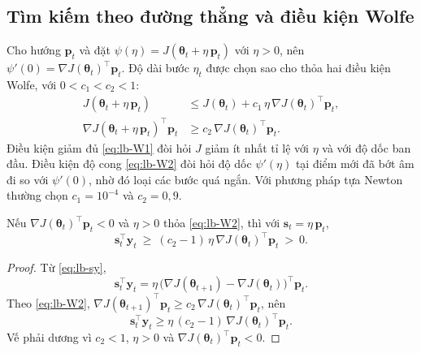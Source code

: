 \subsection{Tìm kiếm theo đường thẳng và điều kiện Wolfe}

Cho hướng $\mathbf{p}_t$ và đặt $\psi(\eta)=J(\boldsymbol{\theta}_t+\eta\,\mathbf{p}_t)$ với $\eta>0$, nên $\psi'(0)=\nabla J(\boldsymbol{\theta}_t)^{\top}\mathbf{p}_t$. Độ dài bước $\eta_t$ được chọn sao cho thỏa hai điều kiện Wolfe, với $0<c_1<c_2<1$:
\begin{align}
  J(\boldsymbol{\theta}_t+\eta\,\mathbf{p}_t)&\le J(\boldsymbol{\theta}_t)+c_1\,\eta\,\nabla J(\boldsymbol{\theta}_t)^{\top}\mathbf{p}_t, \tag{W1}\label{eq:lb-W1}\\
  \nabla J(\boldsymbol{\theta}_t+\eta\,\mathbf{p}_t)^{\top}\mathbf{p}_t&\ge c_2\,\nabla J(\boldsymbol{\theta}_t)^{\top}\mathbf{p}_t. \tag{W2}\label{eq:lb-W2}
\end{align}
Điều kiện giảm đủ \eqref{eq:lb-W1} đòi hỏi $J$ giảm ít nhất tỉ lệ với $\eta$ và với độ dốc ban đầu. Điều kiện độ cong \eqref{eq:lb-W2} đòi hỏi độ dốc $\psi'(\eta)$ tại điểm mới đã bớt âm đi so với $\psi'(0)$, nhờ đó loại các bước quá ngắn. Với phương pháp tựa Newton thường chọn $c_1=10^{-4}$ và $c_2=0{,}9$.

\begin{proposition}\label{prop:lb-wolfe-curv}
Nếu $\nabla J(\boldsymbol{\theta}_t)^{\top}\mathbf{p}_t<0$ và $\eta>0$ thỏa \eqref{eq:lb-W2}, thì với $\mathbf{s}_t=\eta\,\mathbf{p}_t$,
\begin{equation*}
  \mathbf{s}_t^{\top}\mathbf{y}_t\ \ge\ (c_2-1)\,\eta\,\nabla J(\boldsymbol{\theta}_t)^{\top}\mathbf{p}_t\ >\ 0 .
\end{equation*}
\end{proposition}

\begin{proof}
Từ \eqref{eq:lb-sy},
\begin{equation*}
  \mathbf{s}_t^{\top}\mathbf{y}_t=\eta\,\big(\nabla J(\boldsymbol{\theta}_{t+1})-\nabla J(\boldsymbol{\theta}_t)\big)^{\top}\mathbf{p}_t .
\end{equation*}
Theo \eqref{eq:lb-W2}, $\nabla J(\boldsymbol{\theta}_{t+1})^{\top}\mathbf{p}_t\ge c_2\,\nabla J(\boldsymbol{\theta}_t)^{\top}\mathbf{p}_t$, nên
\begin{equation*}
  \mathbf{s}_t^{\top}\mathbf{y}_t\ge\eta\,(c_2-1)\,\nabla J(\boldsymbol{\theta}_t)^{\top}\mathbf{p}_t .
\end{equation*}
Vế phải dương vì $c_2<1$, $\eta>0$ và $\nabla J(\boldsymbol{\theta}_t)^{\top}\mathbf{p}_t<0$.
\end{proof}

